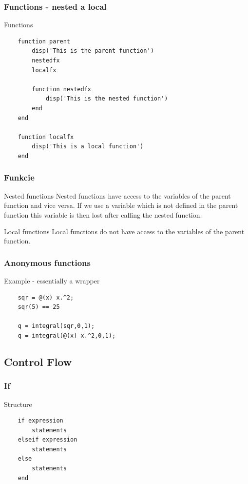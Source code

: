 \documentclass{beamer}
\begin{document}
\begin{frame}[fragile]
\frametitle{Functions - nested a local}
  \begin{block}{Functions}
  \begin{verbatim}
    function parent
        disp('This is the parent function')
        nestedfx
        localfx

        function nestedfx
            disp('This is the nested function')
        end
    end 
    
    function localfx
        disp('This is a local function')
    end\end{verbatim}
  \end{block}
\end{frame}

\begin{frame}
\frametitle{Funkcie}
  \begin{block}{Nested functions}
  Nested functions have access to the variables of the parent function and vice versa. If we use a variable which is not defined in the parent function this variable is then lost after calling the nested function.
  \end{block} 

  \begin{block}{Local functions}
    Local functions do not have access to the variables of the parent function.
  \end{block}  
\end{frame}

\begin{frame}[fragile]
\frametitle{Anonymous functions}
  \begin{block}{Example - essentially a wrapper}
  \begin{verbatim}
    sqr = @(x) x.^2;
    sqr(5) == 25
    
    q = integral(sqr,0,1);
    q = integral(@(x) x.^2,0,1); \end{verbatim}
  \end{block}
\end{frame}

\subsection{Control Flow}

\begin{frame}[fragile]
\frametitle{If}
  \begin{block}{Structure}
  \begin{verbatim}
    if expression
        statements
    elseif expression
        statements
    else
        statements
    end \end{verbatim}
  \end{block}
\end{frame}
\end{document}
